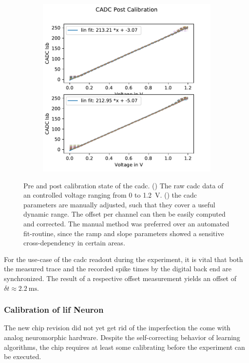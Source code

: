 \begin{figure}
\begin{subfigure}{0.5\textwidth}
		\includegraphics[width=\textwidth]{figures/temporary/cadc_post_calib_hx70.pdf}
		\label{postcadccalib}
	\end{subfigure}
	\caption[Pre and post calibration state of the \gls{cadc}]{Pre and post calibration state of the \gls{cadc}. () The raw cadc data of an controlled voltage ranging from 0 to \SI{1.2}{\V}. () the cadc parameters are manually adjusted, such that they cover a useful dynamic range. The offset per channel can then be easily computed and corrected. The manual method was preferred over an automated fit-routine, since the ramp and slope parameters showed a sensitive cross-dependency in certain areas.}
	\label{cadccalibration}
\end{figure}

For the use-case of the \gls{cadc} readout during the experiment, it is vital that both the measured trace and the recorded spike times by the digital back end are synchronized. The result of a respective offset measurement yields an offset of $\delta t \approx \SI{2.2}{\milli \s}$.

\subsubsection*{Calibration of \gls{lif} Neuron}
The new chip revision did not yet get rid of the imperfection the come with analog neuromorphic hardware. Despite the self-correcting behavior of learning algorithms, the chip requires at least some calibrating before the experiment can be executed.

